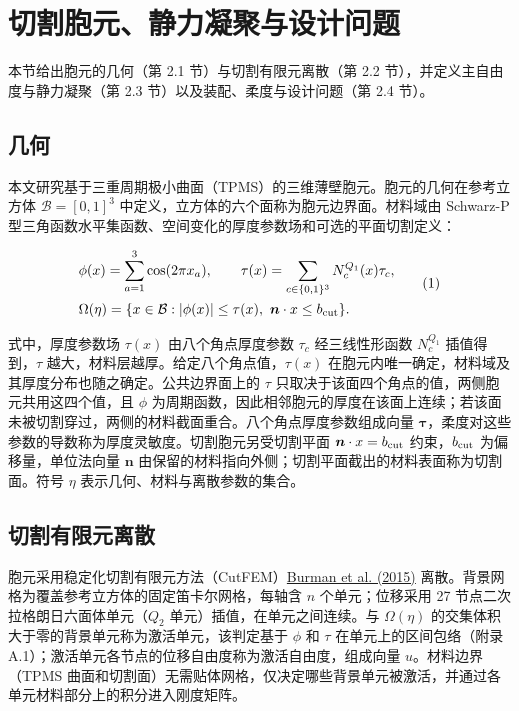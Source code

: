 \documentclass[preprint,12pt,authoryear]{elsarticle}
\begin{document}
\section{切割胞元、静力凝聚与设计问题}

本节给出胞元的几何（第 2.1 节）与切割有限元离散（第 2.2 节），并定义主自由度与静力凝聚（第 2.3 节）以及装配、柔度与设计问题（第 2.4 节）。

\subsection{几何}

本文研究基于三重周期极小曲面（TPMS）的三维薄壁胞元。胞元的几何在参考立方体 \(\mathcal B=[0,1]^3\) 中定义，立方体的六个面称为胞元边界面。材料域由 Schwarz-P 型三角函数水平集函数、空间变化的厚度参数场和可选的平面切割定义：

\[
\begin{aligned}
&\phi(x)=\sum_{a=1}^{3}\cos(2\pi x_a),\qquad
\tau(x)=\sum_{c\in\{0,1\}^{3}}N_c^{Q_1}(x)\tau_c,\\
&\Omega(\eta)=\{x\in\mathcal B:|\phi(x)|\le\tau(x),\ \boldsymbol n\cdot x\le b_{\rm cut}\}.
\end{aligned}
\tag{1}
\]

式中，厚度参数场 \(\tau(x)\) 由八个角点厚度参数 \(\tau_c\) 经三线性形函数 \(N_c^{Q_1}\) 插值得到，\(\tau\) 越大，材料层越厚。给定八个角点值，\(\tau(x)\) 在胞元内唯一确定，材料域及其厚度分布也随之确定。公共边界面上的 \(\tau\) 只取决于该面四个角点的值，两侧胞元共用这四个值，且 \(\phi\) 为周期函数，因此相邻胞元的厚度在该面上连续；若该面未被切割穿过，两侧的材料截面重合。八个角点厚度参数组成向量 \(\boldsymbol\tau\)，柔度对这些参数的导数称为厚度灵敏度。切割胞元另受切割平面 \(\boldsymbol n\cdot x=b_{\rm cut}\) 约束，\(b_{\rm cut}\) 为偏移量，单位法向量 \(\boldsymbol n\) 由保留的材料指向外侧；切割平面截出的材料表面称为切割面。符号 \(\eta\) 表示几何、材料与离散参数的集合。

\subsection{切割有限元离散}

胞元采用稳定化切割有限元方法（CutFEM）\href{https://doi.org/10.1002/nme.4823}{Burman et al. (2015)} 离散。背景网格为覆盖参考立方体的固定笛卡尔网格，每轴含 \(n\) 个单元；位移采用 27 节点二次拉格朗日六面体单元（\(Q_2\) 单元）插值，在单元之间连续。与 \(\Omega(\eta)\) 的交集体积大于零的背景单元称为激活单元，该判定基于 \(\phi\) 和 \(\tau\) 在单元上的区间包络（附录 A.1）；激活单元各节点的位移自由度称为激活自由度，组成向量 \(u\)。材料边界（TPMS 曲面和切割面）无需贴体网格，仅决定哪些背景单元被激活，并通过各单元材料部分上的积分进入刚度矩阵。
\end{document}
